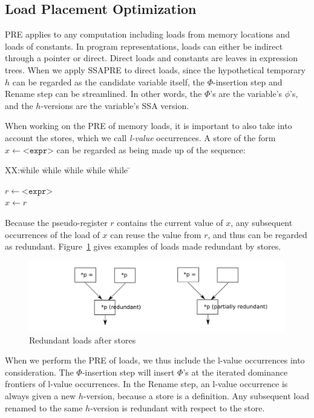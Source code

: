 \subsection{Load Placement Optimization}

PRE applies to any computation including loads from memory locations and
loads of constants.  In program representations, loads can either be indirect 
through a pointer or direct.  Direct loads  and constants are leaves
in expression trees.  
When we apply SSAPRE to direct loads, since the hypothetical temporary $h$ can
be regarded as the candidate variable itself, the $\Phi$-insertion step and
Rename step can be streamlined.  In other words, the $\Phi$'s are the variable's
$\phi$'s, and the $h$-versions are the variable's SSA version.

When working on the PRE of memory loads, it is important to also take into
account the stores, which we call \emph{l-value} occurrences.  A store of the 
form $x \leftarrow \texttt{<expr>}$ can be regarded as being made up of the
sequence:
\begin{tabbing}
XX:\= while \= while \= while \= while \= while \= \kill

\> \> $r \leftarrow \texttt{<expr>}$ \\
\> \> $x \leftarrow r$ \\
\end{tabbing}
Because the pseudo-register $r$ contains the current value of $x$, any
subsequent occurrences of the load of $x$ can reuse the value from $r$, and
thus can be regarded as redundant.   Figure~\ref{fig: lval-occur} gives examples
of loads made redundant by stores.

\begin{figure}
\centering
\includegraphics[scale=0.55]{fig-lval-occur}
\caption{Redundant loads after stores}
\label{fig: lval-occur}
\end{figure}

When we perform the PRE of loads, we thus include the l-value occurrences into
consideration.  The $\Phi$-insertion step will insert $\Phi$'s at the iterated
dominance frontiers of l-value occurrences.  In the Rename step, an l-value
occurrence is always given a new $h$-version, because a store is a definition.
Any subsequent load renamed to the same $h$-version is redundant with respect
to the store.

